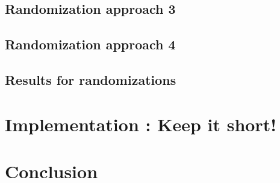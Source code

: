 \documentclass[a4paper,10pt]{article}
\theoremstyle{plain}
\theoremstyle{definition}
\begin{document}
\subsection{Randomization approach 3}

\subsection{Randomization approach 4}

\subsection{Results for randomizations}

\newpage
\section{Implementation : Keep it short!}

\newpage
\section{Conclusion}

\newpage
\end{document}
